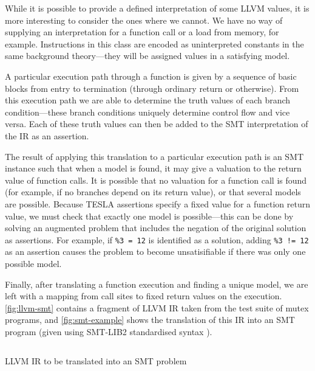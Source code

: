 While it is possible to provide a defined interpretation of some LLVM values, it
is more interesting to consider the ones where we cannot. We have no way of
supplying an interpretation for a function call or a load from memory, for
example. Instructions in this class are encoded as uninterpreted constants in
the same background theory---they will be assigned values in a satisfying model.

A particular execution path through a function is given by a sequence of basic
blocks from entry to termination (through ordinary return or otherwise). From
this execution path we are able to determine the truth values of each branch
condition---these branch conditions uniquely determine control flow and vice
versa. Each of these truth values can then be added to the SMT interpretation of
the IR as an assertion.

The result of applying this translation to a particular execution path is an SMT
instance such that when a model is found, it may give a valuation to the return
value of function calls. It is possible that no valuation for a function call is
found (for example, if no branches depend on its return value), or that several
models are possible. Because TESLA assertions specify a fixed value for a
function return value, we must check that exactly one model is possible---this
can be done by solving an augmented problem that includes the negation of the
original solution as assertions. For example, if \texttt{\%3 = 12} is identified
as a solution, adding \texttt{\%3 != 12} as an assertion causes the problem to
become unsatisifiable if there was only one possible model.

Finally, after translating a function execution and finding a unique model, we
are left with a mapping from call sites to fixed return values on the execution.
\autoref{fig:llvm-smt} contains a fragment of LLVM IR taken from the test suite
of mutex programs, and \autoref{fig:smt-example} shows the translation of this
IR into an SMT program (given using SMT-LIB2 standardised syntax
\cite{BarST-SMT-10}).


\begin{listing}
  \begin{verbatim}
  \end{verbatim}
  \caption{LLVM IR to be translated into an SMT problem}
  \label{fig:llvm-smt}
\end{listing}

